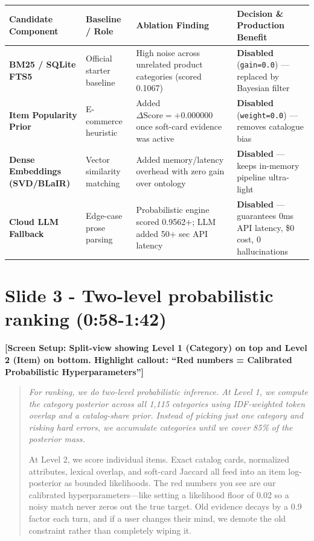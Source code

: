 \documentclass[11pt]{article}
\newenvironment{narration}{\begin{quote}\itshape}{\end{quote}}
\begin{document}
\begin{center}
\small
\begin{tabular}{p{3.5cm}p{4cm}p{4cm}p{3.5cm}}
\toprule
Candidate Component & Baseline / Role & Ablation Finding & Decision \& Production Benefit \\
\midrule
\textbf{BM25 / SQLite FTS5} & Official starter baseline & High noise across unrelated product categories (scored 0.1067) & \textbf{Disabled} (\texttt{gain=0.0}) --- replaced by Bayesian filter \\
\textbf{Item Popularity Prior} & E-commerce heuristic & Added $\Delta\text{Score} = +0.000000$ once soft-card evidence was active & \textbf{Disabled} (\texttt{weight=0.0}) --- removes catalogue bias \\
\textbf{Dense Embeddings (SVD/BLaIR)} & Vector similarity matching & Added memory/latency overhead with zero gain over ontology & \textbf{Disabled} --- keeps in-memory pipeline ultra-light \\
\textbf{Cloud LLM Fallback} & Edge-case prose parsing & Probabilistic engine scored 0.9562+; LLM added 50+ sec API latency & \textbf{Disabled} --- guarantees 0ms API latency, \$0 cost, 0 hallucinations \\
\bottomrule
\end{tabular}
\end{center}

\section*{Slide 3 - Two-level probabilistic ranking (0:58-1:42)}

\textbf{[Screen Setup: Split-view showing Level 1 (Category) on top and Level 2 (Item) on bottom. Highlight callout: ``Red numbers = Calibrated Probabilistic Hyperparameters'']}

\begin{narration}
For ranking, we do two-level probabilistic inference. At Level 1, we compute the category posterior
across all 1,115 categories using IDF-weighted token overlap and a catalog-share prior. Instead of picking
just one category and risking hard errors, we accumulate categories until we cover 85\% of the posterior mass.

At Level 2, we score individual items. Exact catalog cards, normalized attributes, lexical overlap, and
soft-card Jaccard all feed into an item log-posterior as bounded likelihoods. The red numbers you see
are our calibrated hyperparameters---like setting a likelihood floor of 0.02 so a noisy match never zeros
out the true target. Old evidence decays by a 0.9 factor each turn, and if a user changes their mind,
we demote the old constraint rather than completely wiping it.
\end{narration}
\end{document}
